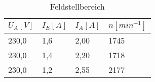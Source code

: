 \begin{table}[htbp]
    \centering
    \begin{tabularx}{\columnwidth}{XXXX}
        \toprule
        $U_A[V]$ & $I_E[A]$ & $I_A[A]$ & $n[min^{-1}]$ \\
        \midrule
        230,0    & 1,6      & 2,00     & 1745          \\
        230,0    & 1,4      & 2,20     & 1718          \\
        230,0    & 1,2      & 2,55     & 2177          \\
        \bottomrule
    \end{tabularx}
    \caption{Feldstellbereich}
\end{table}